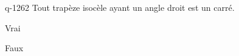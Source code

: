 \begin{truefalse}{q-1262}
Tout trapèze isocèle ayant un angle droit est un carré.
\item Vrai
\item* Faux
\end{truefalse}

